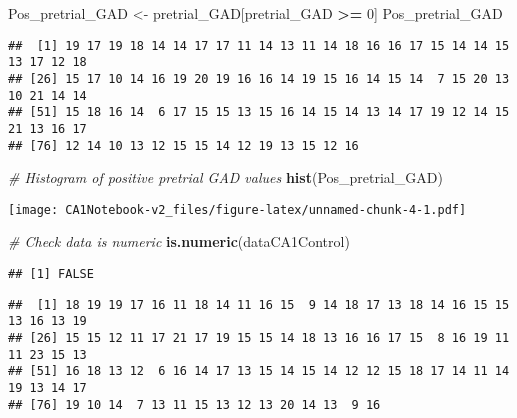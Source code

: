 \documentclass[
]{article}
\newenvironment{Shaded}{\begin{snugshade}}{\end{snugshade}}
\newcommand{\CommentTok}[1]{\textcolor[rgb]{0.56,0.35,0.01}{\textit{#1}}}
\newcommand{\DecValTok}[1]{\textcolor[rgb]{0.00,0.00,0.81}{#1}}
\newcommand{\FunctionTok}[1]{\textcolor[rgb]{0.13,0.29,0.53}{\textbf{#1}}}
\newcommand{\NormalTok}[1]{#1}
\newcommand{\OtherTok}[1]{\textcolor[rgb]{0.56,0.35,0.01}{#1}}
\newcommand{\SpecialCharTok}[1]{\textcolor[rgb]{0.81,0.36,0.00}{\textbf{#1}}}
\newcommand{\StringTok}[1]{\textcolor[rgb]{0.31,0.60,0.02}{#1}}
\begin{document}
\begin{Shaded}
\begin{Highlighting}[]
\NormalTok{Pos\_pretrial\_GAD }\OtherTok{\textless{}{-}}\NormalTok{ pretrial\_GAD[pretrial\_GAD }\SpecialCharTok{\textgreater{}=} \DecValTok{0}\NormalTok{]}
\NormalTok{Pos\_pretrial\_GAD}
\end{Highlighting}
\end{Shaded}

\begin{verbatim}
##  [1] 19 17 19 18 14 14 17 17 11 14 13 11 14 18 16 16 17 15 14 14 15 13 17 12 18
## [26] 15 17 10 14 16 19 20 19 16 16 14 19 15 16 14 15 14  7 15 20 13 10 21 14 14
## [51] 15 18 16 14  6 17 15 15 13 15 16 14 15 14 13 14 17 19 12 14 15 21 13 16 17
## [76] 12 14 10 13 12 15 15 14 12 19 13 15 12 16
\end{verbatim}

\begin{Shaded}
\begin{Highlighting}[]
\CommentTok{\# Histogram of positive pretrial GAD values}
\FunctionTok{hist}\NormalTok{(Pos\_pretrial\_GAD)}
\end{Highlighting}
\end{Shaded}

\texttt{[image: CA1Notebook-v2\_files/figure-latex/unnamed-chunk-4-1.pdf]}

\begin{Shaded}
\begin{Highlighting}[]
\CommentTok{\# Check data is numeric}
\FunctionTok{is.numeric}\NormalTok{(dataCA1Control)}
\end{Highlighting}
\end{Shaded}

\begin{verbatim}
## [1] FALSE
\end{verbatim}

\begin{Shaded}
\end{Shaded}

\begin{verbatim}
##  [1] 18 19 19 17 16 11 18 14 11 16 15  9 14 18 17 13 18 14 16 15 15 13 16 13 19
## [26] 15 15 12 11 17 21 17 19 15 15 14 18 13 16 16 17 15  8 16 19 11 11 23 15 13
## [51] 16 18 13 12  6 16 14 17 13 15 14 15 14 12 12 15 18 17 14 11 14 19 13 14 17
## [76] 19 10 14  7 13 11 15 13 12 13 20 14 13  9 16
\end{verbatim}
\end{document}
